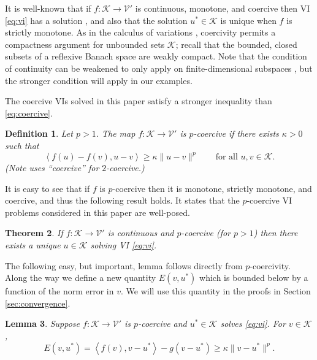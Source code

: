 \documentclass[letterpaper,final,12pt,reqno]{amsart}
\theoremstyle{cstyle}
\newtheorem{theorem}{Theorem}
\newtheorem{lemma}[theorem]{Lemma}
\theoremstyle{cstyle*}
\theoremstyle{dstyle}
\newtheorem{definition}[theorem]{Definition}
\numberwithin{equation}{section}
\numberwithin{figure}{section}
\numberwithin{table}{section}
\numberwithin{theorem}{section}
\newcommand{\cK}{\mathcal{K}}
\newcommand{\cV}{\mathcal{V}}
\newcommand{\ip}[2]{\left<#1,#2\right>}
\begin{document}
It is well-known that if $f:\cK \to \cV'$ is continuous, monotone, and coercive then VI \eqref{eq:vi} has a solution \cite[Corollary III.1.8]{KinderlehrerStampacchia1980}, and also that the solution $u^* \in \cK$ is unique when $f$ is strictly monotone.  As in the calculus of variations \cite{Evans2010}, coercivity permits a compactness argument for unbounded sets $\cK$; recall that the bounded, closed subsets of a reflexive Banach space are weakly compact.  Note that the condition of continuity can be weakened to only apply on finite-dimensional subspaces \cite{KinderlehrerStampacchia1980}, but the stronger condition will apply in our examples.

The coercive VIs solved in this paper satisfy a stronger inequality than \eqref{eq:coercive}.

\begin{definition}  Let $p>1$.  The map $f:\cK \to \cV'$ is \emph{$p$-coercive} if there exists $\kappa>0$ such that
\begin{equation}
\ip{f(u)-f(v)}{u-v} \ge \kappa \|u-v\|^p \qquad \text{for all } u,v \in \cK. \label{eq:pcoercive}
\end{equation}
(Note \cite{Tai2003} uses ``coercive'' for $2$-coercive.)
\end{definition}

It is easy to see that if $f$ is $p$-coercive then it is monotone, strictly monotone, and coercive, and thus the following result holds.  It states that the $p$-coercive VI problems considered in this paper are well-posed.

\begin{theorem}  \label{thm:viwellposed}  If $f:\cK \to \cV'$ is continuous and $p$-coercive (for $p>1$) then there exists a unique $u\in \cK$ solving VI \eqref{eq:vi}.
\end{theorem}

The following easy, but important, lemma follows directly from $p$-coercivity.  Along the way we define a new quantity $E(v,u^*)$ which is bounded below by a function of the norm error in $v$.  We will use this quantity in the proofs in Section \ref{sec:convergence}.

\begin{lemma} \label{lem:normlike}  Suppose $f:\mathcal{K} \to \mathcal{V}'$ is $p$-coercive and $u^* \in \mathcal{K}$ solves \eqref{eq:vi}.  For $v \in \mathcal{K}$,
\begin{equation}
  E(v,u^*) = \ip{f(v)}{v-u^*} - g(v-u^*) \ge \kappa \|v-u^*\|^p.  \label{eq:normlike}
\end{equation}
\end{lemma}
\end{document}
